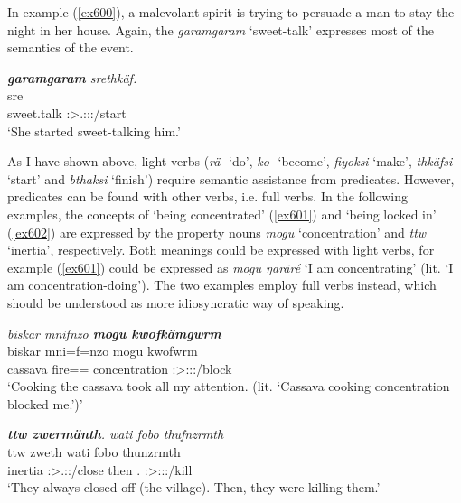 In example (\ref{ex600}), a malevolant spirit is trying to persuade a man to stay the night in her house. Again, the  \emph{garamgaram} `sweet-talk' expresses most of the semantics of the event.

\begin{exe}
	\ex \emph{\textbf{garamgaram} srethkäf.}\\
	 sre\\
	sweet.talk \Stsg:\Sbj>\Tsg.\Masc:\Obj:\Irr:\Pfv/start\\
	\trans `She started sweet-talking him.'
	\label{ex600}
\end{exe}

As I have shown above, light verbs (\emph{rä-} `do', \emph{ko-} `become', \emph{fiyoksi} `make', \emph{thkäfsi} `start' and \emph{bthaksi} `finish') require semantic assistance from  predicates. However,  predicates can be found with other verbs, i.e. full verbs. In the following examples, the concepts of `being concentrated' (\ref{ex601}) and `being locked in' (\ref{ex602}) are expressed by the property nouns \emph{mogu} `concentration' and \emph{ttw} `inertia', respectively. Both meanings could be expressed with light verbs, for example (\ref{ex601}) could be expressed as \emph{mogu ŋaräré} `I am concentrating' (lit. `I am concentration-doing'). The two examples employ full verbs instead, which should be understood as more idiosyncratic way of speaking.

\begin{exe}
	\ex \emph{biskar mnifnzo \textbf{mogu kwofkämgwrm}}\\
	\gll biskar mni=f=nzo mogu kwofwrm\\
	cassava fire=\Erg={\Only} concentration \Stsg:\Sbj>\Fsg:\Obj:\Pst:\Dur/block\\
	\trans `Cooking the cassava took all my attention. (lit. `Cassava cooking concentration blocked me.')'
	\label{ex601}
\end{exe}
\begin{exe}
	\ex \emph{\textbf{ttw zwermänth}. wati fobo thufnzrmth}\\
	\gll ttw zweth wati fobo thunzrmth\\
	inertia \Stpl:\Sbj>\Tsg.\F:\Obj:\Iter/close then \Dist.{\All} \Stpl:\Sbj>\Stpl:\Obj:\Pst:\Dur/kill\\
	\trans `They always closed off (the village). Then, they were killing them.'\\
	\label{ex602}
\end{exe}

